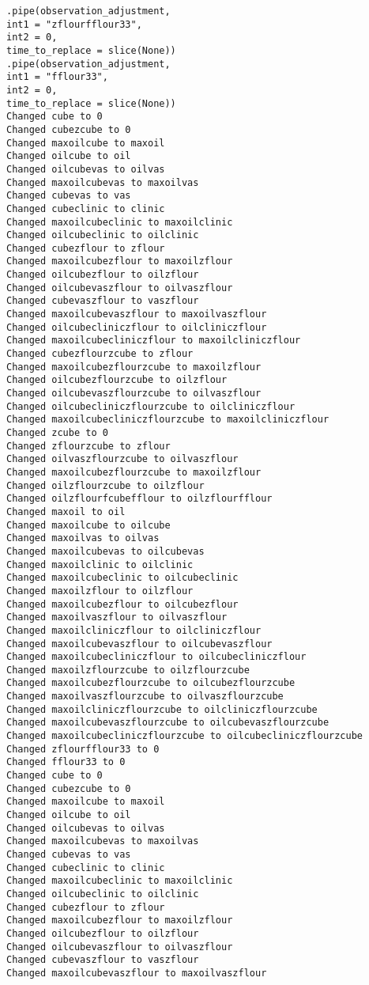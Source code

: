\documentclass[
]{article}
\begin{document}
\begin{verbatim}
.pipe(observation_adjustment,
int1 = "zflourfflour33",
int2 = 0,
time_to_replace = slice(None))
.pipe(observation_adjustment,
int1 = "fflour33",
int2 = 0,
time_to_replace = slice(None))
Changed cube to 0
Changed cubezcube to 0
Changed maxoilcube to maxoil
Changed oilcube to oil
Changed oilcubevas to oilvas
Changed maxoilcubevas to maxoilvas
Changed cubevas to vas
Changed cubeclinic to clinic
Changed maxoilcubeclinic to maxoilclinic
Changed oilcubeclinic to oilclinic
Changed cubezflour to zflour
Changed maxoilcubezflour to maxoilzflour
Changed oilcubezflour to oilzflour
Changed oilcubevaszflour to oilvaszflour
Changed cubevaszflour to vaszflour
Changed maxoilcubevaszflour to maxoilvaszflour
Changed oilcubecliniczflour to oilcliniczflour
Changed maxoilcubecliniczflour to maxoilcliniczflour
Changed cubezflourzcube to zflour
Changed maxoilcubezflourzcube to maxoilzflour
Changed oilcubezflourzcube to oilzflour
Changed oilcubevaszflourzcube to oilvaszflour
Changed oilcubecliniczflourzcube to oilcliniczflour
Changed maxoilcubecliniczflourzcube to maxoilcliniczflour
Changed zcube to 0
Changed zflourzcube to zflour
Changed oilvaszflourzcube to oilvaszflour
Changed maxoilcubezflourzcube to maxoilzflour
Changed oilzflourzcube to oilzflour
Changed oilzflourfcubefflour to oilzflourfflour
Changed maxoil to oil
Changed maxoilcube to oilcube
Changed maxoilvas to oilvas
Changed maxoilcubevas to oilcubevas
Changed maxoilclinic to oilclinic
Changed maxoilcubeclinic to oilcubeclinic
Changed maxoilzflour to oilzflour
Changed maxoilcubezflour to oilcubezflour
Changed maxoilvaszflour to oilvaszflour
Changed maxoilcliniczflour to oilcliniczflour
Changed maxoilcubevaszflour to oilcubevaszflour
Changed maxoilcubecliniczflour to oilcubecliniczflour
Changed maxoilzflourzcube to oilzflourzcube
Changed maxoilcubezflourzcube to oilcubezflourzcube
Changed maxoilvaszflourzcube to oilvaszflourzcube
Changed maxoilcliniczflourzcube to oilcliniczflourzcube
Changed maxoilcubevaszflourzcube to oilcubevaszflourzcube
Changed maxoilcubecliniczflourzcube to oilcubecliniczflourzcube
Changed zflourfflour33 to 0
Changed fflour33 to 0
Changed cube to 0
Changed cubezcube to 0
Changed maxoilcube to maxoil
Changed oilcube to oil
Changed oilcubevas to oilvas
Changed maxoilcubevas to maxoilvas
Changed cubevas to vas
Changed cubeclinic to clinic
Changed maxoilcubeclinic to maxoilclinic
Changed oilcubeclinic to oilclinic
Changed cubezflour to zflour
Changed maxoilcubezflour to maxoilzflour
Changed oilcubezflour to oilzflour
Changed oilcubevaszflour to oilvaszflour
Changed cubevaszflour to vaszflour
Changed maxoilcubevaszflour to maxoilvaszflour

\end{verbatim}
\end{document}
